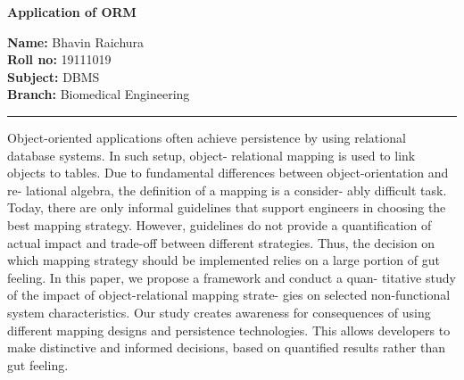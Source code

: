\documentclass[10pt,a4paper,twoside]{article}
\begin{document}
\begin{center}
\vspace{.3cm}
{\bf {\huge Application of ORM }}
\vspace{.3cm}
\end{center}
{\bf Name:}  Bhavin Raichura\\
{\bf Roll no:}  19111019 \\
{\bf Subject:}  DBMS\\
{\bf Branch: }  Biomedical Engineering \hspace{\fill}   \\
\hrule

\vspace{.5cm}
\vspace{.4cm}

\renewcommand{\abstractname}{Abstract}
Object-oriented applications often achieve persistence by using relational database systems. In such setup, object- relational mapping is used to link objects to tables. Due to fundamental differences between object-orientation and re- lational algebra, the definition of a mapping is a consider- ably difficult task. Today, there are only informal guidelines that support engineers in choosing the best mapping strategy. However, guidelines do not provide a quantification of actual impact and trade-off between different strategies. Thus, the decision on which mapping strategy should be implemented relies on a large portion of gut feeling. In this paper, we propose a framework and conduct a quan- titative study of the impact of object-relational mapping strate- gies on selected non-functional system characteristics. Our study creates awareness for consequences of using different mapping designs and persistence technologies. This allows developers to make distinctive and informed decisions, based on quantified results rather than gut feeling.

\begin{abstract}

\end{abstract}
\end{document}
